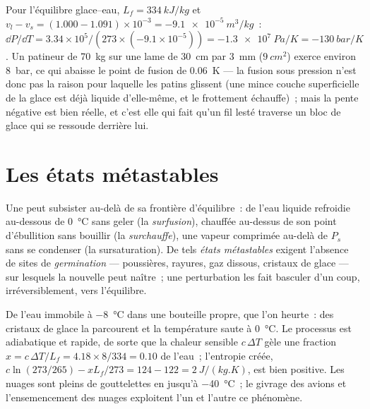 \begin{example}\label{ex:b1:phase-changes:skate}
Pour l'équilibre glace--eau, $L_f = \qty{334}{kJ/kg}$ et $v_l - v_s = (1.000 - 1.091)
\times 10^{-3} = \qty{-9.1e-5}{m^3/kg}$~: $\dd P/\dd T = 3.34 \times 10^5/(273 \times
(-9.1 \times 10^{-5})) = \qty{-1.3e7}{Pa/K} = \qty{-130}{bar/K}$. Un patineur de \qty{70}{kg}
sur une lame de \qty{30}{cm} par \qty{3}{mm} ($\qty{9}{cm^2}$) exerce
environ \qty{8}{bar}, ce qui abaisse le point de fusion de \qty{0.06}{K} --- la fusion sous pression n'est donc pas la raison pour laquelle les patins glissent (une mince
couche superficielle de la glace est déjà liquide d'elle-même, et le
frottement échauffe)~; mais la pente négative est bien réelle, et c'est elle
qui fait qu'un fil lesté traverse un bloc de glace qui se ressoude derrière lui.
\end{example}

\section{Les états métastables}

\begin{definition}\label{def:b1:phase-changes:metastable}
Une  peut subsister au-delà de sa frontière d'équilibre~: de l'eau
liquide refroidie au-dessous de \qty{0}{\degreeCelsius} sans geler (la
\emph{surfusion}), chauffée au-dessus de son point d'ébullition sans bouillir
(la \emph{surchauffe}), une vapeur comprimée au-delà de $P_s$ sans se
condenser (la sursaturation). De tels \emph{états métastables} exigent
l'absence de sites de \emph{germination} --- poussières, rayures, gaz dissous,
cristaux de glace --- sur lesquels la nouvelle  peut naître~; une
perturbation les fait basculer d'un coup, irréversiblement, vers l'équilibre.
\end{definition}

\begin{example}\label{ex:b1:phase-changes:supercooled}
De l'eau immobile à \qty{-8}{\degreeCelsius} dans une bouteille propre, que
l'on heurte~: des cristaux de glace la parcourent et la température saute à
\qty{0}{\degreeCelsius}. Le processus est adiabatique et rapide, de sorte que
la chaleur sensible $c\,\Delta T$ gèle une fraction $x = c\,\Delta T/L_f = 4.18 \times 8/334 =
0.10$ de l'eau~; l'entropie créée, $c\ln(273/265) - xL_f/273 =
124 - 122 = \qty{+2}{J/(kg.K)}$, est bien positive. Les nuages sont pleins de
gouttelettes en  jusqu'à \qty{-40}{\degreeCelsius}~; le givrage des
avions et l'ensemencement des nuages exploitent l'un et l'autre ce phénomène.
\end{example}

